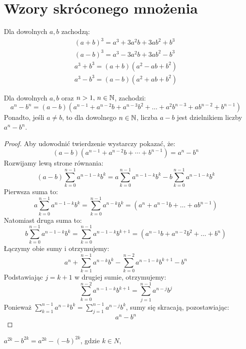 \section{Wzory skróconego mnożenia}

\begin{theorem}
  Dla dowolnych $a, b$ zachodzą:
\begin{align*}
  \left(a + b\right)^3 = a^3 + 3a^2b + 3ab^2 + b^3 \\
  \left(a - b\right)^3 = a^3 - 3a^2b + 3ab^2 - b^3 \\
  a^3 + b^3 = \left(a + b\right)\left(a^2 - ab + b^2\right) \\
  a^3 - b^3 = \left(a - b\right)\left(a^2 + ab + b^2\right)
\end{align*}
\end{theorem}

\begin{theorem}
  Dla dowolnych $a, b$ oraz $n > 1, \, n \in \mathbb{N}$, zachodzi:
  \[
    a^n - b^n = \left(a - b\right)\left(a^{n - 1} + a^{n - 2}b + a^{n - 3}b^2 + \dots + a^2b^{n - 3} + ab^{n - 2} + b^{n - 1}\right)
  \]
  Ponadto, jeśli $a \neq b$, to dla dowolnego $n \in \mathbb{N}$, liczba $a - b$ jest dzielnikiem liczby $a^n - b^n$.
\end{theorem}
\begin{proof}
  Aby udowodnić twierdzenie wystarczy pokazać, że:
  \[(a - b)(a^{n-1} + a^{n-2}b + \cdots + b^{n-1}) = a^n - b^n\]
  Rozwijamy lewą strone równania:
    \[
      \left(a - b\right) \sum_{k = 0}^{n - 1}a^{n - 1 - k}b^k =
      a \sum_{k = 0}^{n - 1}a^{n - 1 - k}b^k - b \sum_{k = 0}^{n - 1}a^{n - 1 - k}b^k
    \]
  Pierwsza suma to:
  \[
    a\sum_{k = 0}^{n - 1}a^{n - 1 - k}b^{k} = \sum_{k = 0}^{n - 1}a^{n - k}b^{k} = \left(a^n + a^{n - 1}b + \dots + ab^{n - 1}\right)
  \]
  Natomiast druga suma to:
  \[
    b\sum_{k = 0}^{n - 1}a^{n - 1 - k}b^{k} = \sum_{k = 0}^{n - 1}a^{n - 1 - k}b^{k + 1} = \left(a^{n - 1}b + a^{n - 2}b^2 + \dots + b^n\right)
  \]
  Łączymy obie sumy i otrzymujemy:
  \[
    a^n + \sum_{k = 1}^{n - 1}a^{n - k}b^{k} - \sum_{k = 0}^{n - 2}a^{n - 1 - k}b^{k + 1} - b^n
  \]
  Podstawiając \(j = k + 1\) w drugiej sumie, otrzymujemy:
  \[
    \sum_{k = 0}^{n - 2}a^{n - 1 - k}b^{k + 1} = \sum_{j = 1}^{n - 1}a^{n - j}b^{j}
  \]
  Ponieważ \(\sum_{k = 1}^{n - 1}a^{n - k}b^k = \sum_{j = 1}^{n - 1}a^{n - j}b^k\), sumy się skracają, pozostawiając:
  \[
    a^n - b^n
  \]
\end{proof}


\begin{example}
  $a^{2k} - b^{2k} = a^{2k} - \left(-b\right)^{2k}$, gdzie $k \in N$,
\end{example}
